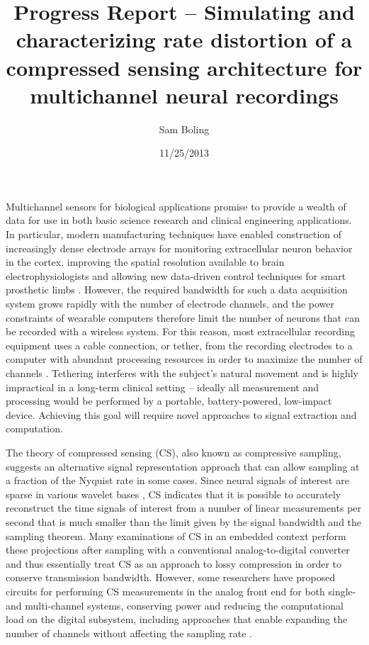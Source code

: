 \documentclass{paper}
\title{Progress Report -- Simulating and characterizing rate distortion of a compressed sensing architecture for multichannel neural recordings}
\author{Sam Boling}
\date{11/25/2013}
\begin{document}
\maketitle

Multichannel sensors for biological applications promise to provide a wealth of data for use in both basic science research and clinical engineering applications. In particular, modern manufacturing techniques have enabled construction of increasingly dense electrode arrays for monitoring extracellular neuron behavior in the cortex, improving the spatial resolution available to brain electrophysiologists and allowing new data-driven control techniques for smart prosthetic limbs \cite{hochberg2012}. However, the required bandwidth for such a data acquisition system grows rapidly with the number of electrode channels, and the power constraints of wearable computers therefore limit the number of neurons that can be recorded with a wireless system. For this reason, most extracellular recording equipment uses a cable connection, or tether, from the recording electrodes to a computer with abundant processing resources in order to maximize the number of channels \cite{nicolelis2001}. Tethering interferes with the subject's natural movement and is highly impractical in a long-term clinical setting -- ideally all measurement and processing would be performed by a portable, battery-powered, low-impact device. Achieving this goal will require novel approaches to signal extraction and computation.

The theory of compressed sensing (CS), also known as compressive sampling, suggests an alternative signal representation approach that can allow sampling at a fraction of the Nyquist rate in some cases. Since neural signals of interest are sparse in various wavelet bases \cite{charbiwala2011}, CS indicates that it is possible to accurately reconstruct the time signals of interest from a number of linear measurements per second that is much smaller than the limit given by the signal bandwidth and the sampling theorem. Many examinations of CS in an embedded context perform these projections after sampling with a conventional analog-to-digital converter and thus essentially treat CS as an approach to lossy compression in order to conserve transmission bandwidth. However, some researchers have proposed circuits for performing CS measurements in the analog front end for both single- and multi-channel systems, conserving power and reducing the computational load on the digital subsystem, including approaches that enable expanding the number of channels without affecting the sampling rate \cite{kirolos2006, slavinsky2011}.
\end{document}
